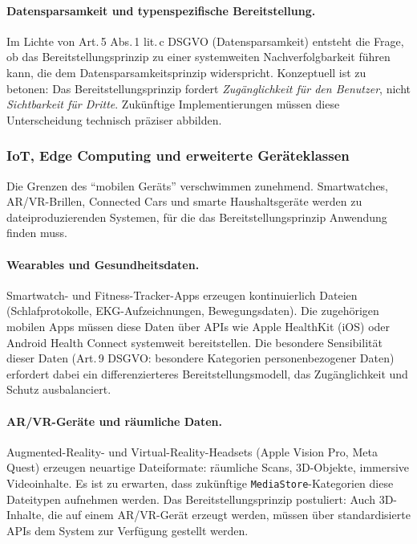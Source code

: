 ﻿\documentclass[12pt, a4paper]{article}
\begin{document}
\paragraph{Datensparsamkeit und typenspezifische Bereitstellung.}
Im Lichte von Art.\,5 Abs.\,1 lit.\,c DSGVO (Datensparsamkeit) entsteht die Frage, ob
das Bereitstellungsprinzip zu einer systemweiten Nachverfolgbarkeit führen kann, die dem
Datensparsamkeitsprinzip widerspricht. Konzeptuell ist zu betonen: Das Bereitstellungsprinzip
fordert \emph{Zugänglichkeit für den Benutzer}, nicht \emph{Sichtbarkeit für Dritte}.
Zukünftige Implementierungen müssen diese Unterscheidung technisch präziser abbilden.

\subsubsection{IoT, Edge Computing und erweiterte Geräteklassen}

Die Grenzen des \enquote{mobilen Geräts} verschwimmen zunehmend. Smartwatches,
AR/VR-Brillen, Connected Cars und smarte Haushaltsgeräte werden zu dateiproduzierenden
Systemen, für die das Bereitstellungsprinzip Anwendung finden muss.

\paragraph{Wearables und Gesundheitsdaten.}
Smartwatch- und Fitness-Tracker-Apps erzeugen kontinuierlich Dateien (Schlafprotokolle,
EKG-Aufzeichnungen, Bewegungsdaten). Die zugehörigen mobilen Apps müssen diese Daten
über APIs wie Apple HealthKit (iOS) oder Android Health Connect systemweit bereitstellen.
Die besondere Sensibilität dieser Daten (Art.\,9 DSGVO: besondere Kategorien
personenbezogener Daten) erfordert dabei ein differenzierteres Bereitstellungsmodell,
das Zugänglichkeit und Schutz ausbalanciert.

\paragraph{AR/VR-Geräte und räumliche Daten.}
Augmented-Reality- und Virtual-Reality-Headsets (Apple Vision Pro, Meta Quest) erzeugen
neuartige Dateiformate: räumliche Scans, 3D-Objekte, immersive Videoinhalte. Es ist zu
erwarten, dass zukünftige \texttt{MediaStore}-Kategorien diese Dateitypen aufnehmen
werden. Das Bereitstellungsprinzip postuliert: Auch 3D-Inhalte, die auf einem
AR/VR-Gerät erzeugt werden, müssen über standardisierte APIs dem System zur Verfügung
gestellt werden.
\end{document}
